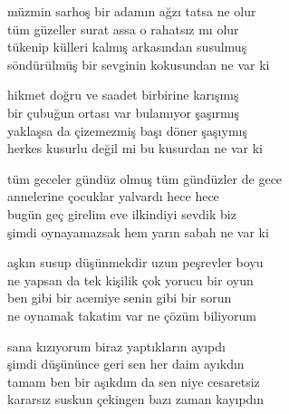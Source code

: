\documentclass[10pt, openright, oneside]{memoir}
\theoremstyle{definition}
\begin{document}
%
\newpage
{}
\vspace*{\fill}
\settowidth{\versewidth}{tüm geceler gündüz olmuş tüm gündüzler de gece}
\begin{cverse}
  müzmin sarhoş bir adamın ağzı tatsa ne olur \\
  tüm güzeller surat assa o rahatsız mı olur \\
  tükenip külleri kalmış arkasından susulmuş \\
  söndürülmüş bir sevginin kokusundan ne var ki

  hikmet doğru ve saadet birbirine karışmış \\
  bir çubuğun ortası var bulamıyor şaşırmış \\
  yaklaşsa da çizemezmiş başı döner şaşıymış \\
  herkes kusurlu değil mi bu kusurdan ne var ki

  tüm geceler gündüz olmuş tüm gündüzler de gece \\
  annelerine çocuklar yalvardı hece hece \\
  bugün geç girelim eve ilkindiyi sevdik biz \\
  şimdi oynayamazsak hem yarın sabah ne var ki \\
\end{cverse}
\vspace*{\fill}
%
\newpage
{}
\vspace*{\fill}
\settowidth{\versewidth}{ne yapsan da tek kişilik çok yorucu bir oyun}
\begin{cverse}
  aşkın susup düşünmekdir uzun peşrevler boyu \\
  ne yapsan da tek kişilik çok yorucu bir oyun \\
  ben gibi bir acemiye senin gibi bir sorun \\
  ne oynamak takatim var ne çözüm biliyorum

  sana kızıyorum biraz yaptıkların ayıpdı \\
  şimdi düşününce geri sen her daim ayıkdın \\
  tamam ben bir aşıkdım da sen niye cesaretsiz \\
  kararsız suskun çekingen bazı zaman kayıpdın \\
\end{cverse}
\vspace*{\fill}
%
\newpage
{}
\vspace*{\fill}
\end{document}
